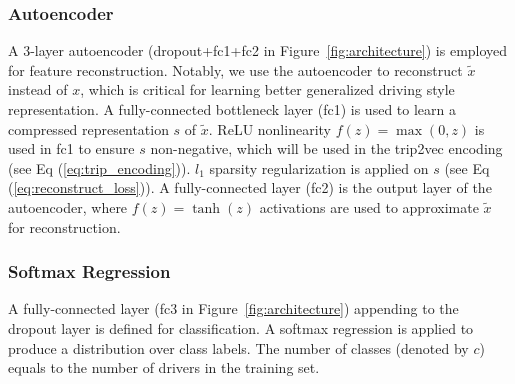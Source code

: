 \documentclass{article}
\begin{document}
\subsubsection{Autoencoder}
A 3-layer autoencoder (dropout+fc1+fc2 in Figure~\ref{fig:architecture}) is employed for feature reconstruction.
Notably, we use the autoencoder to reconstruct $\tilde{x}$ instead of $x$, which is critical for learning better generalized driving style representation.
A fully-connected bottleneck layer (fc1) %
is used to learn a compressed representation $s$ of $\tilde{x}$.
ReLU nonlinearity $f(z)=\max(0,z)$ is used in fc1 to ensure $s$ non-negative, which will be used in the trip2vec encoding (see Eq (\ref{eq:trip_encoding})).
$l_1$ sparsity regularization is applied on $s$ (see Eq (\ref{eq:reconstruct_loss})). %
A fully-connected layer (fc2) %
is the output layer of the autoencoder, where $f(z)=\tanh(z)$ activations are used to approximate $\tilde{x}$ for reconstruction.

\subsubsection{Softmax Regression}
A fully-connected layer (fc3 in Figure~\ref{fig:architecture}) appending to the dropout layer is defined for classification. A softmax regression is applied to produce a distribution over class labels.
The number of classes (denoted by $c$) equals to the number of drivers in the training set.
\end{document}
